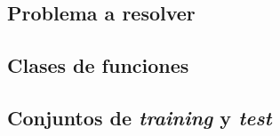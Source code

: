 \documentclass[a4paper, 20pt]{article}
\begin{document}
{\parskip=2pt
  \tableofcontents
}
\pagebreak

\section{}
\subsection{Problema a resolver}

\subsection{Clases de funciones}

\subsection{Conjuntos de \textit{training} y \textit{test}}

\end{document}
